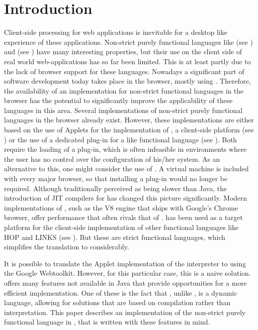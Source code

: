 \section{Introduction}\label{sapljs:sec:intro}
Client-side processing for  web applications is inevitable for a desktop like experience
of these applications.
Non-strict purely functional languages like \Haskell (see \cite{Haskell}) and \Clean (see \cite{Clean}) 
have many interesting properties, but their use on the client side of real world web-applications 
has so far been limited. 
This is at least partly due to the lack of browser support for these languages.
Nowadays a significant part of software development today takes place in the browser, mostly 
using \JavaScript. 
Therefore, the availability of an implementation for non-strict functional languages 
in the browser has the potential to significantly 
improve the applicability of these languages in this area.
Several implementations of non-strict purely functional languages in the browser already exist. 
However, these implementations are either based on the use of \Java Applets for the implementation 
of \Sapl, a client-side \Clean platform (see \cite{JKP,PJKA,iEditors}) or the use of a dedicated plug-in 
for a \Haskell like functional language (see \cite{HaskellScript}).
Both require the loading of a plug-in, which is often infeasible in environments where the user has no 
control over the 
configuration of his/her system. As an alternative to this, one might consider the use of \JavaScript. 
A \JavaScript virtual machine is included with every major browser, so that installing a plug-in would no longer be required. 
Although traditionally perceived as being slower than Java, the introduction of JIT compilers for \JavaScript has changed this picture significantly. 
Modern implementations of \JavaScript, such as the V8 engine that ships with Google’s Chrome browser, offer performance that often rivals that of \Java.
\JavaScript has been used as a target platform for the client-side implementation of other functional languages like HOP and LINKS (see \cite{HOP1,HOP2,LINKS1}). But these are strict functional languages, which simplifies the translation to \JavaScript considerably.

It is possible to translate the \Java Applet implementation of the \Sapl interpreter to \JavaScript 
using the Google Webtoolkit. 
However, for this particular case, this is a naive solution. \JavaScript offers many features not available in Java that provide opportunities for a more efficient implementation. One of these is the fact that \JavaScript, unlike \Java, is a dynamic language, allowing for solutions that are based on compilation rather than interpretation. This paper describes an implementation of the non-strict purely functional language \Sapl in \JavaScript, that is written with these features in mind.

